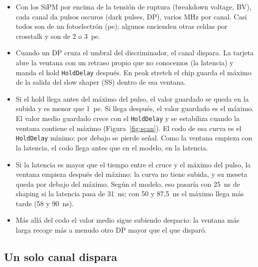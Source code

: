 \documentclass[11pt,a4paper]{article}
\begin{document}
\begin{itemize}
\item Con los SiPM por encima de la tensión de ruptura (breakdown voltage,
  BV), cada canal da pulsos oscuros (dark pulses, DP), varios MHz por canal.
  Casi todos son de un fotoelectrón (pe); algunos encienden otras celdas por
  crosstalk y son de 2 o 3~pe.
\item Cuando un DP cruza el umbral del discriminador, el canal dispara. La
  tarjeta abre la ventana con un retraso propio que no conocemos (la
  latencia) y manda el hold \texttt{HoldDelay} después. En peak stretch el
  chip guarda el máximo de la salida del slow shaper (SS) dentro de esa
  ventana.
\item Si el hold llega antes del máximo del pulso, el valor guardado se queda
  en la subida y es menor que 1~pe. Si llega después, el valor guardado es el
  máximo. El valor medio guardado crece con el \texttt{HoldDelay} y se
  estabiliza cuando la ventana contiene el máximo
  (Figura~\ref{fig:scan}). El codo de esa curva es el \texttt{HoldDelay}
  mínimo: por debajo se pierde señal. Como la ventana empieza con la
  latencia, el codo llega antes que en el modelo, en la latencia.
\item Si la latencia es mayor que el tiempo entre el cruce y el máximo del
  pulso, la ventana empieza después del máximo: la curva no tiene subida, y
  su meseta queda por debajo del máximo. Según el modelo, eso pasaría con
  25~ns de shaping si la latencia pasa de 31~ns; con 50 y 87,5~ns el máximo
  llega más tarde (58 y 90~ns).
\item Más allá del codo el valor medio sigue subiendo despacio: la ventana
  más larga recoge más a menudo otro DP mayor que el que disparó.
\end{itemize}



\subsection*{Un solo canal dispara}
\end{document}
